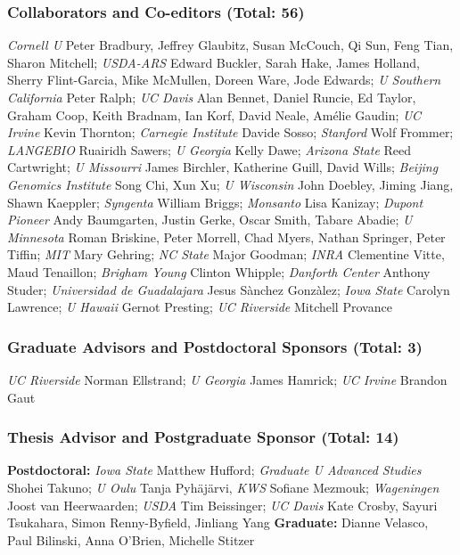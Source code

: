 \subsubsection*{Collaborators and Co-editors (Total: 56)}
\emph{Cornell U} Peter Bradbury, Jeffrey Glaubitz, Susan McCouch, Qi Sun, Feng Tian, Sharon Mitchell;
\emph{USDA-ARS} Edward Buckler, Sarah Hake, James Holland, Sherry Flint-Garcia, Mike McMullen, Doreen Ware, Jode Edwards;
\emph{U Southern California} Peter Ralph;
\emph{UC Davis} Alan Bennet, Daniel Runcie, Ed Taylor, Graham Coop, Keith Bradnam, Ian Korf, David Neale, Am\'elie Gaudin;
\emph{UC Irvine} Kevin Thornton;
\emph{Carnegie Institute} Davide Sosso;
\emph{Stanford} Wolf Frommer;
\emph{LANGEBIO} Ruairidh Sawers;
\emph{U Georgia} Kelly Dawe;
\emph{Arizona State} Reed Cartwright;
\emph{U Missourri} James Birchler, Katherine Guill, David Wills;
\emph{Beijing Genomics Institute} Song Chi, Xun Xu;
\emph{U Wisconsin} John Doebley, Jiming Jiang, Shawn Kaeppler;
\emph{Syngenta} William Briggs;
\emph{Monsanto} Lisa Kanizay;
\emph{Dupont Pioneer} Andy Baumgarten, Justin Gerke, Oscar Smith, Tabare Abadie;
\emph{U Minnesota} Roman Briskine, Peter Morrell, Chad Myers, Nathan Springer, Peter Tiffin;
\emph{MIT} Mary Gehring; 
\emph{NC State} Major Goodman; 
\emph{INRA} Clementine Vitte, Maud Tenaillon; 
\emph{Brigham Young} Clinton Whipple; 
\emph{Danforth Center} Anthony Studer; 
\emph{Universidad de Guadalajara} Jesus S\`anchez Gonz\`alez; 
\emph{Iowa State} Carolyn Lawrence; 
\emph{U Hawaii} Gernot Presting; 
\emph{UC Riverside} Mitchell Provance \\ 

\subsubsection*{Graduate Advisors and Postdoctoral Sponsors (Total: 3)}
\emph{UC Riverside} Norman Ellstrand; \emph{U Georgia} James Hamrick; \emph{UC Irvine} Brandon Gaut 

\subsubsection*{Thesis Advisor and Postgraduate Sponsor (Total: 14)}
{\bf Postdoctoral:} \emph{Iowa State} Matthew Hufford; \emph{Graduate U Advanced Studies} Shohei Takuno; \emph{U Oulu} Tanja Pyh\"aj\"arvi, \emph{KWS} Sofiane Mezmouk; \emph{Wageningen} Joost van Heerwaarden; \emph{USDA} Tim Beissinger; \emph{UC Davis} Kate Crosby, Sayuri Tsukahara, Simon Renny-Byfield, Jinliang Yang {\bf Graduate:} Dianne Velasco, Paul Bilinski, Anna O'Brien, Michelle Stitzer


%